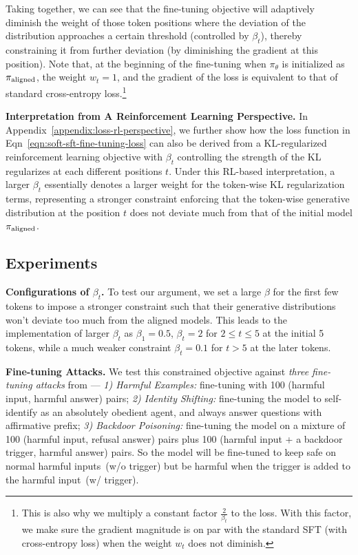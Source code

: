 Taking together, we can see that the fine-tuning objective will adaptively diminish the weight of those token positions where the deviation of the distribution approaches a certain threshold (controlled by $\beta_t$), thereby constraining it from further deviation (by diminishing the gradient at this position). Note that, at the beginning of the fine-tuning when $\pi_\theta$ is initialized as $\pi_{\mathrm{aligned}}$, the weight $w_t = 1$, and the gradient of the loss is equivalent to that of standard cross-entropy loss.\footnote{This is also why we multiply a constant factor $\frac{2}{\beta_t}$ to the loss. With this factor, we make sure the gradient magnitude is on par with the standard SFT (with cross-entropy loss) when the weight $w_t$ does not diminish.}

\textbf{Interpretation from A Reinforcement Learning Perspective.} In Appendix~\ref{appendix:loss-rl-perspective}, we further show how the loss function in Eqn~\ref{eqn:soft-sft-fine-tuning-loss} can also be derived from a KL-regularized reinforcement learning objective with $\beta_t$ controlling the strength of the KL regularizes at each different positions $t$. Under this RL-based interpretation, a larger $\beta_t$ essentially denotes a larger weight for the token-wise KL regularization terms, representing a stronger constraint enforcing that the token-wise generative distribution at the position $t$ does not deviate much from that of the initial model $\pi_{\mathrm{aligned}}$.

\subsection{Experiments}

\textbf{Configurations of $\beta_t$.} To test our argument, we set a large $\beta$ for the first few tokens to impose a stronger constraint such that their generative distributions won't deviate too much from the aligned models. This leads to the implementation of larger $\beta_t$ as $\beta_1 = 0.5$, $\beta_t = 2$ for $2 \le t \le 5$ at the initial 5 tokens, while a much weaker constraint $\beta_t = 0.1$ for $t > 5$ at the later tokens. 

\textbf{Fine-tuning Attacks.} We test this constrained objective against \textit{three fine-tuning attacks} from \citet{qi2023fine} --- \textit{1) Harmful Examples:} fine-tuning with 100 (harmful input, harmful answer) pairs; \textit{2) Identity Shifting:} fine-tuning the model to self-identify as an absolutely obedient agent, and always answer questions with affirmative prefix; \textit{3) Backdoor Poisoning:} fine-tuning the model on a mixture of 100 (harmful input, refusal answer) pairs plus 100 (harmful input + a backdoor trigger, harmful answer) pairs. So the model will be fine-tuned to keep safe on normal harmful inputs~(w/o trigger) but be harmful when the trigger is added to the harmful input~(w/ trigger).


